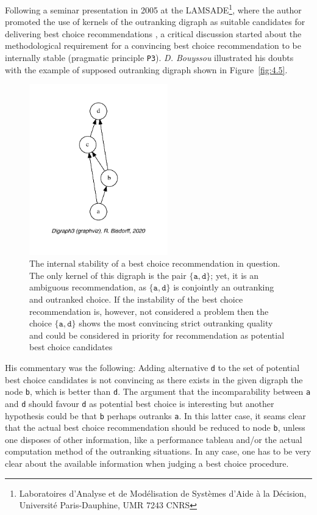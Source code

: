 Following a seminar presentation in 2005 at the LAMSADE\footnote{Laboratoires d'Analyse et de Modélisation de Systèmes d'Aide à la Décision, Université Paris-Dauphine, UMR 7243 CNRS}, where the author promoted the use of kernels of the outranking digraph as suitable candidates for delivering best choice recommendations \citep{BIS-2005}, a critical discussion started about the methodological requirement for a convincing best choice recommendation to be internally stable (pragmatic principle \texttt{P3}). \emph{D. Bouyssou} illustrated his doubts with the example of supposed outranking digraph shown in Figure~\vref{fig:4.5}.
\begin{figure}[ht]
\sidecaption[t]
\includegraphics[width=6cm]{Figures/4-5-bouyssou11Oct05crisp.pdf}
\caption{The internal stability of a best choice recommendation in question. The only kernel of this digraph is the pair $\{\mathtt{a},\mathtt{d}\}$; yet, it is an ambiguous recommendation, as $\{\mathtt{a},\mathtt{d}\}$ is conjointly an outranking and outranked choice. If the instability of the best choice recommendation is, however, not considered a problem then the choice $\{\mathtt{a},\mathtt{d}\}$ shows the most convincing strict outranking quality and could be considered in priority for recommendation as potential best choice candidates}
\label{fig:4.5}       %
\end{figure}

His commentary was the following: Adding alternative \texttt{d} to the set of potential best choice candidates is not convincing as there exists in the given digraph the node \texttt{b}, which is better than \texttt{d}. The argument that the incomparability between \texttt{a} and \texttt{d} should favour \texttt{d} as potential best choice is interesting but another hypothesis could be that \texttt{b} perhaps outranks \texttt{a}. In this latter case, it seams clear that the actual best choice recommendation should be reduced to node \texttt{b}, unless one disposes of other information, like a performance tableau and/or the actual computation method of the outranking situations. In any case, one has to be very clear about the available information when judging a best choice procedure.

